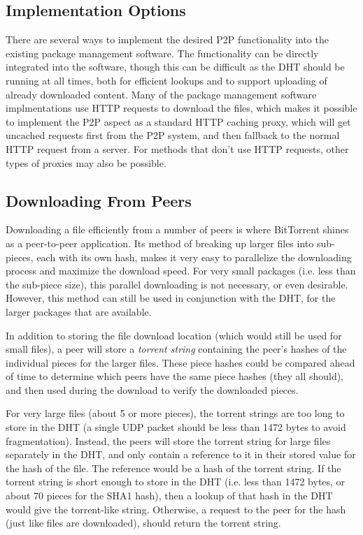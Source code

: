 \documentclass[conference]{IEEEtran}
\begin{document}
\subsection{Implementation Options}
\label{imp_options}

There are several ways to implement the desired P2P functionality
into the existing package management software. The functionality can
be directly integrated into the software, though this can be
difficult as the DHT should be running at all times, both for
efficient lookups and to support uploading of already downloaded
content. Many of the package management software implmentations use
HTTP requests to download the files, which makes it possible to
implement the P2P aspect as a standard HTTP caching proxy, which
will get uncached requests first from the P2P system, and then
fallback to the normal HTTP request from a server. For methods that
don't use HTTP requests, other types of proxies may also be
possible.

\subsection{Downloading From Peers}
\label{downloading}

Downloading a file efficiently from a number of peers is where
BitTorrent shines as a peer-to-peer application. Its method of
breaking up larger files into sub-pieces, each with its own hash,
makes it very easy to parallelize the downloading process and
maximize the download speed. For very small packages (i.e. less than
the sub-piece size), this parallel downloading is not necessary, or
even desirable. However, this method can still be used in
conjunction with the DHT, for the larger packages that are
available.

In addition to storing the file download location (which would still
be used for small files), a peer will store a \emph{torrent string}
containing the peer's hashes of the individual pieces for the larger
files. These piece hashes could be compared ahead of time to
determine which peers have the same piece hashes (they all should),
and then used during the download to verify the downloaded pieces.

For very large files (about 5 or more pieces), the torrent strings
are too long to store in the DHT (a single UDP packet should be less
than 1472 bytes to avoid fragmentation). Instead, the peers will
store the torrent string for large files separately in the DHT, and
only contain a reference to it in their stored value for the hash of
the file. The reference would be a hash of the torrent string. If
the torrent string is short enough to store in the DHT (i.e. less
than 1472 bytes, or about 70 pieces for the SHA1 hash), then a
lookup of that hash in the DHT would give the torrent-like string.
Otherwise, a request to the peer for the hash (just like files are
downloaded), should return the torrent string.
\end{document}
